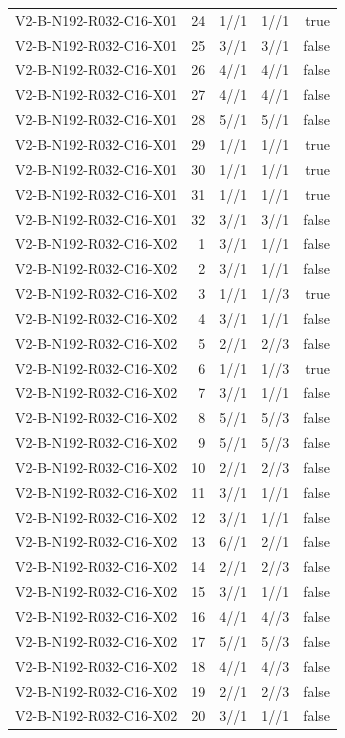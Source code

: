 {\begin{longtable}{lrrrr}
V2-B-N192-R032-C16-X01 & 24 & 1//1 & 1//1 & true \\
V2-B-N192-R032-C16-X01 & 25 & 3//1 & 3//1 & false \\
V2-B-N192-R032-C16-X01 & 26 & 4//1 & 4//1 & false \\
V2-B-N192-R032-C16-X01 & 27 & 4//1 & 4//1 & false \\
V2-B-N192-R032-C16-X01 & 28 & 5//1 & 5//1 & false \\
V2-B-N192-R032-C16-X01 & 29 & 1//1 & 1//1 & true \\
V2-B-N192-R032-C16-X01 & 30 & 1//1 & 1//1 & true \\
V2-B-N192-R032-C16-X01 & 31 & 1//1 & 1//1 & true \\
V2-B-N192-R032-C16-X01 & 32 & 3//1 & 3//1 & false \\
V2-B-N192-R032-C16-X02 & 1 & 3//1 & 1//1 & false \\
V2-B-N192-R032-C16-X02 & 2 & 3//1 & 1//1 & false \\
V2-B-N192-R032-C16-X02 & 3 & 1//1 & 1//3 & true \\
V2-B-N192-R032-C16-X02 & 4 & 3//1 & 1//1 & false \\
V2-B-N192-R032-C16-X02 & 5 & 2//1 & 2//3 & false \\
V2-B-N192-R032-C16-X02 & 6 & 1//1 & 1//3 & true \\
V2-B-N192-R032-C16-X02 & 7 & 3//1 & 1//1 & false \\
V2-B-N192-R032-C16-X02 & 8 & 5//1 & 5//3 & false \\
V2-B-N192-R032-C16-X02 & 9 & 5//1 & 5//3 & false \\
V2-B-N192-R032-C16-X02 & 10 & 2//1 & 2//3 & false \\
V2-B-N192-R032-C16-X02 & 11 & 3//1 & 1//1 & false \\
V2-B-N192-R032-C16-X02 & 12 & 3//1 & 1//1 & false \\
V2-B-N192-R032-C16-X02 & 13 & 6//1 & 2//1 & false \\
V2-B-N192-R032-C16-X02 & 14 & 2//1 & 2//3 & false \\
V2-B-N192-R032-C16-X02 & 15 & 3//1 & 1//1 & false \\
V2-B-N192-R032-C16-X02 & 16 & 4//1 & 4//3 & false \\
V2-B-N192-R032-C16-X02 & 17 & 5//1 & 5//3 & false \\
V2-B-N192-R032-C16-X02 & 18 & 4//1 & 4//3 & false \\
V2-B-N192-R032-C16-X02 & 19 & 2//1 & 2//3 & false \\
V2-B-N192-R032-C16-X02 & 20 & 3//1 & 1//1 & false \\

\end{longtable}}
